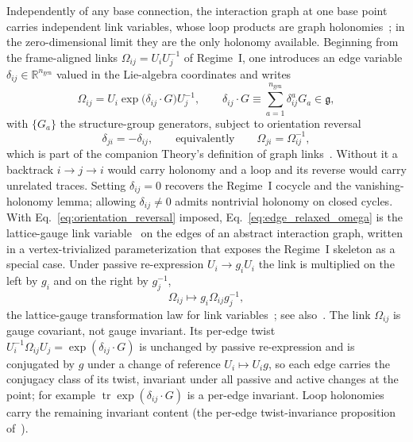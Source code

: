 Independently of any base connection, the interaction graph at one base point carries independent link variables, whose loop products are graph holonomies~\cite[Ch.~2]{DennisGaugeVFE2026}; in the zero-dimensional limit they are the only holonomy available. Beginning from the frame-aligned links $\Omega_{ij} = U_iU_j^{-1}$ of Regime~I, one introduces an edge variable $\delta_{ij} \in \mathbb{R}^{n_{\mathrm{gen}}}$ valued in the Lie-algebra coordinates and writes
\begin{equation}
\Omega_{ij} = U_i \exp\big(\delta_{ij}\cdot G\big) U_j^{-1},
\qquad
\delta_{ij}\cdot G \equiv \sum_{a=1}^{n_{\mathrm{gen}}} \delta_{ij}^{a} G_a \in \mathfrak{g},
\label{eq:edge_relaxed_omega}
\end{equation}
with $\{G_a\}$ the structure-group generators, subject to orientation reversal
\begin{equation}
\delta_{ji} = -\delta_{ij},
\qquad\text{equivalently}\qquad
\Omega_{ji} = \Omega_{ij}^{-1},
\label{eq:orientation_reversal}
\end{equation}
which is part of the companion Theory's definition of graph links~\cite[Ch.~2]{DennisGaugeVFE2026}. Without it a backtrack $i \to j \to i$ would carry holonomy and a loop and its reverse would carry unrelated traces. Setting $\delta_{ij}=0$ recovers the Regime~I cocycle and the vanishing-holonomy lemma; allowing $\delta_{ij}\neq 0$ admits nontrivial holonomy on closed cycles. With Eq.~\eqref{eq:orientation_reversal} imposed, Eq.~\eqref{eq:edge_relaxed_omega} is the lattice-gauge link variable~\cite{WilsonConfinement1974, KogutSusskind1975, Creutz1983} on the edges of an abstract interaction graph, written in a vertex-trivialized parameterization that exposes the Regime~I skeleton as a special case. Under passive re-expression $U_i \to g_i U_i$ the link is multiplied on the left by $g_i$ and on the right by $g_j^{-1}$,
\begin{equation}
\Omega_{ij} \longmapsto g_i \Omega_{ij} g_j^{-1},
\label{eq:omega_gauge_law}
\end{equation}
the lattice-gauge transformation law for link variables~\cite[Eqs.~(3.27)--(3.28)]{WilsonConfinement1974}; see also~\cite{Creutz1983}. The link $\Omega_{ij}$ is gauge covariant, not gauge invariant. Its per-edge twist $U_i^{-1}\Omega_{ij}U_j = \exp(\delta_{ij}\cdot G)$ is unchanged by passive re-expression and is conjugated by $g$ under a change of reference $U_i \mapsto U_ig$, so each edge carries the conjugacy class of its twist, invariant under all passive and active changes at the point; for example $\operatorname{tr}\exp(\delta_{ij}\cdot G)$ is a per-edge invariant. Loop holonomies carry the remaining invariant content (the per-edge twist-invariance proposition of~\cite[Ch.~2]{DennisGaugeVFE2026}).

